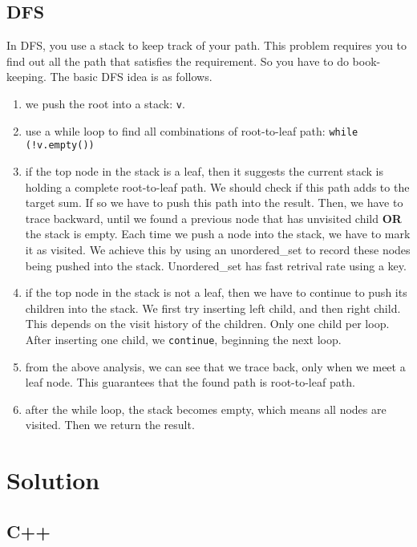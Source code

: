 \documentclass[12pt]{book}
\begin{document}
\subsection{DFS}
\label{sec:orgac1484b}
In DFS, you use a stack to keep track of your path. This problem requires you to find out all the path that satisfies the requirement. So you have to do book-keeping. The basic DFS idea is as follows.
\begin{enumerate}
\item we push the root into a stack: \texttt{v}.
\item use a while loop to find all combinations of root-to-leaf path: \texttt{while (!v.empty())}
\item if the top node in the stack is a leaf, then it suggests the current stack is holding a complete root-to-leaf path. We should check if this path adds to the target sum. If so we have to push this path into the result. Then, we have to trace backward, until we found a previous node that has unvisited child \textbf{OR} the stack is empty. Each time we push a node into the stack, we have to mark it as visited. We achieve this by using an unordered\_set to record these nodes being pushed into the stack. Unordered\_set has fast retrival rate using a key.
\item if the top node in the stack is not a leaf, then we have to continue to push its children into the stack. We first try inserting left child, and then right child. This depends on the visit history of the children. Only one child per loop. After inserting one child, we \texttt{continue}, beginning the next loop.
\item from the above analysis, we can see that we trace back, only when we meet a leaf node. This guarantees that the found path is root-to-leaf path.
\item after the while loop, the stack becomes empty, which means all nodes are visited. Then we return the result.
\end{enumerate}

\section{Solution}
\label{sec:org68baf1a}
\subsection{C++}
\label{sec:orgc979a29}
\end{document}
